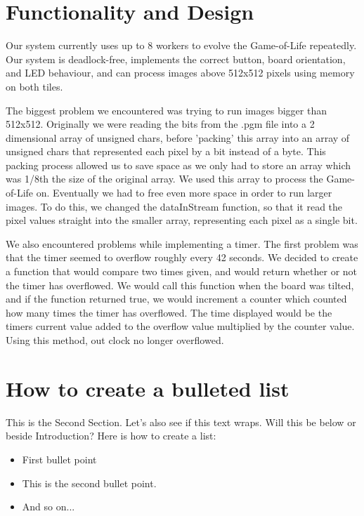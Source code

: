 \documentclass{article}
\begin{document}
\begin{multicols}{2}

\section{Functionality and Design}
Our system currently uses up to 8 workers to evolve the Game-of-Life repeatedly. Our system is 
deadlock-free, implements the correct button, board orientation, and LED behaviour, and can process 
images above 512x512 pixels using memory on both tiles.

The biggest problem we encountered was trying to run images bigger than 512x512. Originally we were 
reading the bits from the .pgm file into a 2 dimensional array of unsigned chars, before 'packing' 
this array into an array of unsigned chars that represented each pixel by a bit instead of a byte. 
This packing process allowed us to save space as we only had to store an array which was 1/8th the 
size of the original array. We used this array to process the Game-of-Life on. Eventually we had to 
free even more space in order to run larger images. To do this, we changed the dataInStream function, 
so that it read the pixel values straight into the smaller array, representing each pixel as a 
single bit. 

We also encountered problems while implementing a timer. The first problem was that the timer seemed 
to overflow roughly every 42 seconds. We decided to create a function that would compare two times 
given, and would return whether or not the timer has overflowed. We would call this function when 
the board was tilted, and if the function returned true, we would increment a counter which counted 
how many times the timer has overflowed. The time displayed would be the timers current value added 
to the overflow value multiplied by the counter value. Using this method, out clock no longer 
overflowed.

\section{How to create a bulleted list}
This is the Second Section. Let's also see if this text wraps. Will this be below or beside Introduction? Here is how to create a list:

\begin{itemize}
\item First bullet point
\item This is the second bullet point.
\item And so on...
\end{itemize}


\end{multicols}
\end{document}
